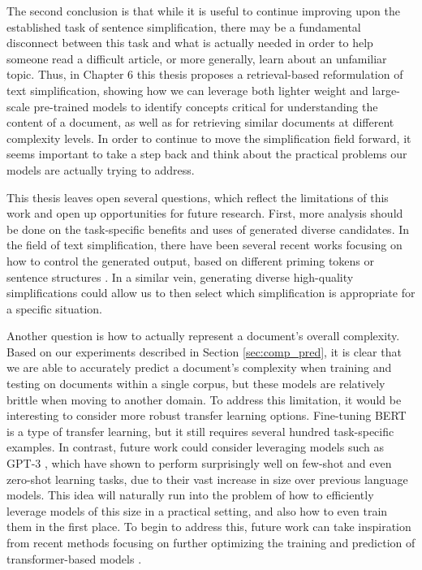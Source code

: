 \documentclass[thesis.tex]{subfiles}
\begin{document}
The second conclusion is that while it is useful to continue improving upon the established task of sentence simplification, there may be a fundamental disconnect between this task and what is actually needed in order to help someone read a difficult article, or more generally, learn about an unfamiliar topic. Thus, in Chapter 6 this thesis proposes a retrieval-based reformulation of text simplification, showing how we can leverage both lighter weight and large-scale pre-trained models to identify concepts critical for understanding the content of a document, as well as for retrieving similar documents at different complexity levels. In order to continue to move the simplification field forward, it seems important to take a step back and think about the practical problems our models are actually trying to address.

This thesis leaves open several questions, which reflect the limitations of this work and open up opportunities for future research. First, more analysis should be done on the task-specific benefits and uses of generated diverse candidates. In the field of text simplification, there have been several recent works focusing on how to control the generated output, based on different priming tokens or sentence structures \citep{mallinson2019controllable,martin2020controllagle}. In a similar vein, generating diverse high-quality simplifications could allow us to then select which simplification is appropriate for a specific situation.

Another question is how to actually represent a document's overall complexity. Based on our experiments described in Section \ref{sec:comp_pred}, it is clear that we are able to accurately predict a document's complexity when training and testing on documents within a single corpus, but these models are relatively brittle when moving to another domain. To address this limitation, it would be interesting to consider more robust transfer learning options. Fine-tuning BERT is a type of transfer learning, but it still requires several hundred task-specific examples. In contrast, future work could consider leveraging models such as GPT-3 \citep{brown2020language}, which have shown to perform surprisingly well on few-shot and even zero-shot learning tasks, due to their vast increase in size over previous language models. This idea will naturally run into the problem of how to efficiently leverage models of this size in a practical setting, and also how to even train them in the first place. To begin to address this, future work can take inspiration from recent methods focusing on further optimizing the training and prediction of transformer-based models \citep{kitaev2020reformer}.
\end{document}
